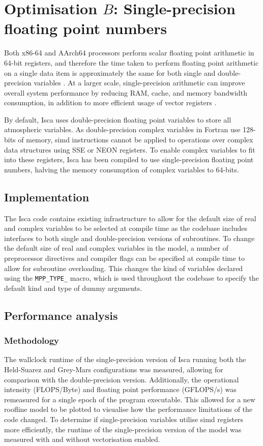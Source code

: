 \documentclass[a4paper,11pt]{report}
\begin{document}
\section{Optimisation $B$: Single-precision floating point numbers}
\label{sec:floating-pont}
Both x86-64 and AArch64 processors perform scalar floating point arithmetic in 64-bit registers, and therefore the time taken to perform floating point arithmetic on a single data item is approximately the same for both single and double-precision variables \cite{reinders2013intel, aa2011armv8}.   At a larger scale, single-precision arithmetic can improve overall system performance by reducing RAM, cache, and memory bandwidth consumption, in addition to more efficient usage of vector registers \cite{goldberg1991every}.
\par
By default, Isca uses double-precision floating point variables to store all atmospheric variables. As double-precision complex variables in Fortran use 128-bits of memory, \gls{simd} instructions cannot be applied to operations over complex data structures using SSE or NEON registers. To enable complex variables to fit into these registers, Isca has been compiled to use single-precision floating point numbers, halving the memory consumption of complex variables to 64-bits.

\subsection{Implementation}
The Isca code contains existing infrastructure to allow for the default size of real and complex variables to be selected at compile time as the codebase includes interfaces to both single and double-precision versions of subroutines. To change the default size of real and complex variables in the model, a number of preprocessor directives and compiler flags can be specified at compile time to allow for subroutine overloading. This changes the kind of variables declared using the \texttt{MPP\_TYPE\_} macro, which is used throughout the codebase to specify the default kind and type of dummy arguments. 



\subsection{Performance analysis}

\subsubsection{Methodology}
The wallclock runtime of the single-precision version of Isca running both the Held-Suarez and Grey-Mars configurations was measured, allowing for comparison with the double-precision version. Additionally, the operational intensity (FLOPS/Byte) and floating point performance (GFLOPS/s) was remeasured for a single epoch of the program executable. This allowed for a new roofline model to be plotted to visualise how the performance limitations of the code changed. To determine if single-precision variables utilise \gls{simd} registers more efficiently, the runtime of the single-precision version of the model was measured with and without vectorisation enabled. 
\end{document}
